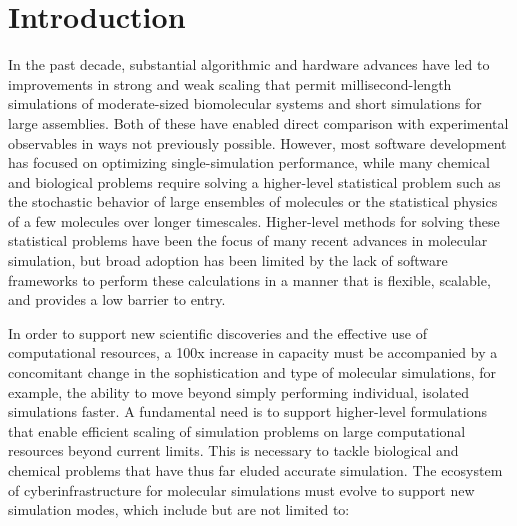 \documentclass[10pt,letterpaper,draft]{article}
\begin{document}
\vspace{0.15in}

\section*{Introduction}

In the past decade, substantial algorithmic and hardware advances have led to
improvements in strong and weak scaling that permit millisecond-length
simulations of moderate-sized biomolecular systems and short simulations for
large assemblies.  Both of these have enabled direct comparison with
experimental observables in ways not previously possible.  However, most
software development has focused on optimizing single-simulation performance,
while many chemical and biological problems require solving a higher-level
statistical problem such as the stochastic behavior of large ensembles of
molecules or the statistical physics of a few molecules over longer timescales.
Higher-level methods for solving these statistical problems have been the focus
of many recent advances in molecular simulation, but broad adoption has been
limited by the lack of software frameworks to perform these calculations in a
manner that is flexible, scalable, and provides a low barrier to entry.

In order to support new scientific discoveries and the effective use of
computational resources, a 100x increase in capacity must be accompanied by a
concomitant change in the sophistication and type of molecular simulations, for
example, the ability to move beyond simply performing individual, isolated
simulations faster. A fundamental need is to support higher-level formulations
that enable efficient scaling of simulation problems on large computational
resources beyond current limits.  This is necessary to tackle biological and
chemical problems that have thus far eluded accurate simulation.  The ecosystem
of cyberinfrastructure for molecular simulations must evolve to support new
simulation modes, which include but are not limited to:
\end{document}
